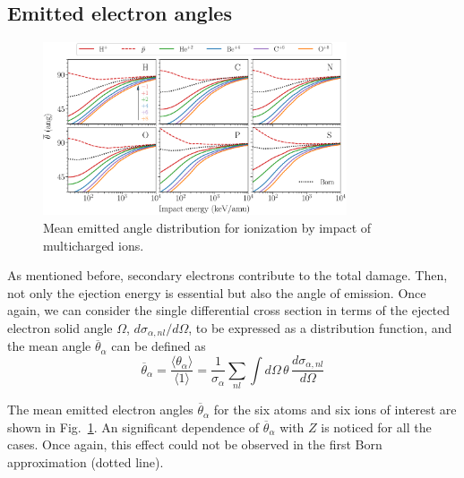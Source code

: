 \documentclass[10pt,showpacs,twocolumn]{revtex4}
\begin{document}
\subsection{Emitted electron angles}
\label{subsec:meanang}

\begin{figure}[t!]
\centering
\includegraphics[width=0.8\textwidth]{figuras/ang_mean.eps}
\caption{Mean emitted angle distribution for ionization by impact of
multicharged ions.}
\label{fig:emittedang}
\end{figure} 

As mentioned before, secondary electrons contribute to the total damage. 
Then, not only the ejection energy is essential but also the angle 
of emission. Once again, we can consider the single differential cross 
section in terms of the ejected electron solid angle $\Omega$, 
$d\sigma_{\alpha,nl}/d\Omega$, to be expressed as a distribution function, 
and the mean angle $\overline{\theta}_{\alpha}$ can be defined as
\begin{equation}
\overline{\theta}_{\alpha}=\frac{\langle\theta_{\alpha}\rangle}
{\langle 1\rangle}=\frac{1}{\sigma_{\alpha}}\sum\limits_{nl}
\int d\Omega\,\theta\,\frac{d\sigma_{\alpha,nl}}{d\Omega}
\end{equation}


The mean emitted electron angles $\overline{\theta}_{\alpha}$ for the 
six atoms and six ions of interest are shown in Fig.~\ref{fig:emittedang}.
An significant dependence of $\overline{\theta}_{\alpha}$ with $Z$ is 
noticed for all the cases. Once again, this effect could not be 
observed in the first Born approximation (dotted line).
\end{document}

